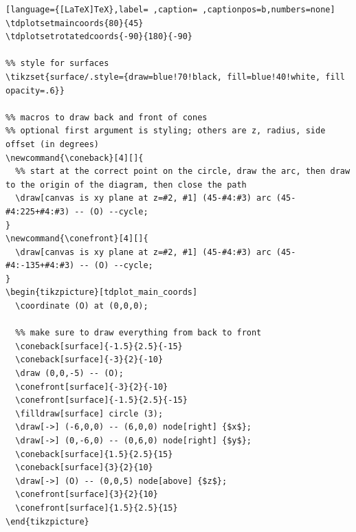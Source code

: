 \documentclass[a4paper,12pt]{article}
\begin{document}
\begin{lstlisting}[language={[LaTeX]TeX},label= ,caption= ,captionpos=b,numbers=none]
\tdplotsetmaincoords{80}{45}
\tdplotsetrotatedcoords{-90}{180}{-90}

%% style for surfaces
\tikzset{surface/.style={draw=blue!70!black, fill=blue!40!white, fill opacity=.6}}

%% macros to draw back and front of cones
%% optional first argument is styling; others are z, radius, side offset (in degrees)
\newcommand{\coneback}[4][]{
  %% start at the correct point on the circle, draw the arc, then draw to the origin of the diagram, then close the path
  \draw[canvas is xy plane at z=#2, #1] (45-#4:#3) arc (45-#4:225+#4:#3) -- (O) --cycle;
}
\newcommand{\conefront}[4][]{
  \draw[canvas is xy plane at z=#2, #1] (45-#4:#3) arc (45-#4:-135+#4:#3) -- (O) --cycle;
}
\begin{tikzpicture}[tdplot_main_coords]
  \coordinate (O) at (0,0,0);

  %% make sure to draw everything from back to front
  \coneback[surface]{-1.5}{2.5}{-15}
  \coneback[surface]{-3}{2}{-10}
  \draw (0,0,-5) -- (O);
  \conefront[surface]{-3}{2}{-10}
  \conefront[surface]{-1.5}{2.5}{-15}
  \filldraw[surface] circle (3);
  \draw[->] (-6,0,0) -- (6,0,0) node[right] {$x$};
  \draw[->] (0,-6,0) -- (0,6,0) node[right] {$y$};
  \coneback[surface]{1.5}{2.5}{15}
  \coneback[surface]{3}{2}{10}
  \draw[->] (O) -- (0,0,5) node[above] {$z$};
  \conefront[surface]{3}{2}{10}
  \conefront[surface]{1.5}{2.5}{15}
\end{tikzpicture}
\end{lstlisting}

\\[0pt]
\end{document}
